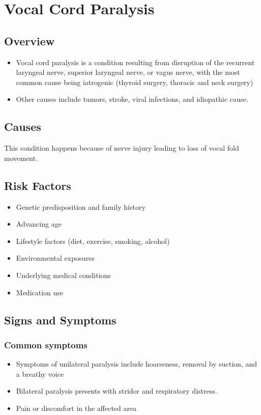 \chapter{Vocal Cord Paralysis}
\label{sec:Vocal Cord Paralysis}

\section{Overview}


\begin{itemize}[noitemsep]
  \item Vocal cord paralysis is a condition resulting from disruption of the recurrent laryngeal nerve, superior laryngeal nerve, or vagus nerve, with the most common cause being iatrogenic (thyroid surgery, thoracic and neck surgery)
  \item Other causes include tumors, stroke, viral infections, and idiopathic cause.
\end{itemize}
\section{Causes}
This condition happens because of nerve injury leading to loss of vocal fold movement.     
\section{Risk Factors}

\begin{itemize}[noitemsep]
  \item Genetic predisposition and family history
  \item Advancing age
  \item Lifestyle factors (diet, exercise, smoking, alcohol)
  \item Environmental exposures
  \item Underlying medical conditions
  \item Medication use
\end{itemize}
\section{Signs and Symptoms}

\subsection{Common symptoms}
\begin{itemize}[noitemsep]
  \item Symptoms of unilateral paralysis include hoarseness, removal by suction, and a breathy voice
  \item Bilateral paralysis presents with stridor and respiratory distress.
  \item Pain or discomfort in the affected area
  \end{itemize}

